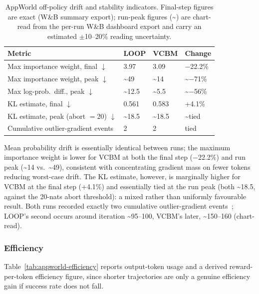 \begin{table}[H]
  \centering
  \caption{AppWorld off-policy drift and stability indicators. Final-step figures are exact (W\&B summary export); run-peak figures (\textasciitilde) are chart-read from the per-run W\&B dashboard export and carry an estimated $\pm$10--20\% reading uncertainty.}
  \label{tab:appworld-drift}
  \begin{tabularx}{\linewidth}{@{}l Z Z Z@{}}
    \toprule
    \textbf{Metric}                              & \textbf{LOOP}       & \textbf{VCBM}       & \textbf{Change}        \\
    \midrule
    Max importance weight, final $\downarrow$    & 3.97                & 3.09                & $-$22.2\%              \\
    Max importance weight, peak $\downarrow$     & \textasciitilde49   & \textasciitilde14   & \textasciitilde$-$71\% \\
    Max log-prob.\ diff., peak $\downarrow$      & \textasciitilde12.5 & \textasciitilde5.5  & \textasciitilde$-$56\% \\
    KL estimate, final $\downarrow$              & 0.561               & 0.583               & +4.1\%                 \\
    KL estimate, peak (abort $=$20) $\downarrow$ & \textasciitilde18.5 & \textasciitilde18.5 & \textasciitilde tied   \\
    Cumulative outlier-gradient events           & 2                   & 2                   & tied                   \\
    \bottomrule
  \end{tabularx}
\end{table}

Mean probability drift is essentially identical between runs; the maximum importance weight is lower for VCBM at both the final step ($-$22.2\%) and run peak (\textasciitilde14 vs.\ \textasciitilde49), consistent with concentrating gradient mass on fewer tokens reducing worst-case drift. The KL estimate, however, is marginally higher for VCBM at the final step (+4.1\%) and essentially tied at the run peak (both \textasciitilde18.5, against the 20-nats abort threshold): a mixed rather than uniformly favourable result. Both runs recorded exactly two cumulative outlier-gradient events~\cite{du2017saddlepoints,hardt2016trainfaster}; LOOP's second occurs around iteration \textasciitilde95--100, VCBM's later, \textasciitilde150--160 (chart-read).

\subsubsection{Efficiency}
Table~\ref{tab:appworld-efficiency} reports output-token usage and a derived reward-per-token efficiency figure, since shorter trajectories are only a genuine efficiency gain if success rate does not fall.


